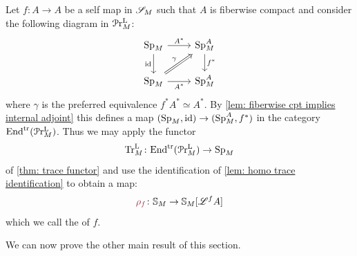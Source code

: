 \begin{cons}\label{cons: Reidemeister trace}
  Let $f\colon A\to A$ be a self map in $\mathscr{S}_{M}$ such that $A$ is fiberwise compact
  and consider the following diagram in $\mathcal{P}\mathrm{r}^{\mathrm{L}}_{M}$:
  \[
  \begin{tikzcd}
	{\pSp{\base}} & {\pSp{\base}[A]} \\
	{\pSp{\base}} & {\pSp{\base}[A]}
	\arrow["{A^{*}}", from=1-1, to=1-2]
	\arrow["{\id}"', from=1-1, to=2-1]
	\arrow["f^*", from=1-2, to=2-2]
	\arrow["\gamma", Rightarrow, from=2-1, to=1-2]
	\arrow["{A^*}"', from=2-1, to=2-2]
  \end{tikzcd}
  \]
  where $\gamma$ is the preferred equivalence $f^*A^*\simeq A^*$. 
By \autoref{lem: fiberwise cpt implies internal adjoint} this defines 
a map $(\pSp{\base}, \id )\to (\pSp{\base}[A],f^*)$ in the category $\mathrm{End}^{\mathrm{tr}}(\mathcal{P}\mathrm{r}^{\mathrm{L}}_{M})$. 
Thus we may apply the functor 
\[\TrcL \colon \Endtrl(\pPrlf{\base}) \to \pSp{\base}\]
of \autoref{thm: trace functor}
and use the  identification of \autoref{lem: homo trace identification} to obtain a map:
\[ \mdef{\rho_f}\colon \SS_{\base} \to \SS_{\base}[\cL^fA] \]
which we call the  of $f$. 
\end{cons}

We can now prove the other main result of this section.

